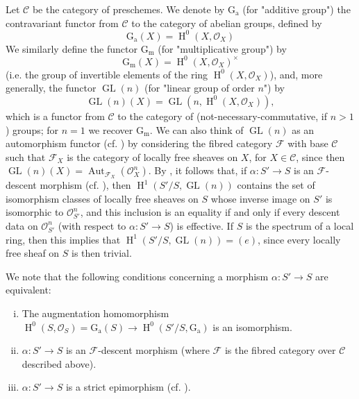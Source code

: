 \label{fga3.i-a.4.e}
\begin{example}\label{fga3.i-a.4-example-2}
    Let $\mathcal{C}$ be the category of preschemes.
    We denote by $\operatorname{G_a}$ (for "additive group") the contravariant functor from $\mathcal{C}$ to the category of abelian groups, defined by
    \[
        \operatorname{G_a}(X) = \operatorname{H}^0(X,\mathcal{O}_X)
    \]
    We similarly define the functor $\operatorname{G_m}$ (for "multiplicative group") by
    \[
        \operatorname{G_m}(X) = \operatorname{H}^0(X,\mathcal{O}_X)^\times
    \]
    (i.e. the group of invertible elements of the ring $\operatorname{H}^0(X,\mathcal{O}_X)$), and, more generally, the functor $\operatorname{GL}(n)$ (for "linear group of order $n$") by
    \[
        \operatorname{GL}(n)(X) = \operatorname{GL}(n,\operatorname{H}^0(X,\mathcal{O}_X)),
    \]
    which is a functor from $\mathcal{C}$ to the category of (not-necessary-commutative, if $n>1$) groups;
    for $n=1$ we recover $\operatorname{G_m}$.
    We can also think of $\operatorname{GL}(n)$ as an automorphism functor (cf. ) by considering the fibred category $\mathcal{F}$ with base $\mathcal{C}$ such that $\mathcal{F}_X$ is the category of locally free sheaves on $X$, for $X\in\mathcal{C}$, since then $\operatorname{GL}(n)(X)=\operatorname{Aut}_{\mathcal{F}_X}(\mathcal{O}_X^n)$.
    By , it follows that, if $\alpha\colon S'\to S$ is an $\mathcal{F}$-descent morphism (cf. ), then $\operatorname{H}^1(S'/S,\operatorname{GL}(n))$ contains the set of isomorphism classes of locally free sheaves on $S$ whose inverse image on $S'$ is isomorphic to $\mathcal{O}_{S'}^n$, and this inclusion is an equality if and only if every descent data on $\mathcal{O}_{S'}^n$ (with respect to $\alpha\colon S'\to S$) is effective.
    If $S$ is the spectrum of a local ring, then this implies that $\operatorname{H}^1(S'/S,\operatorname{GL}(n))=(e)$, since every locally free sheaf on $S$ is then trivial.
\end{example}

We note that the following conditions concerning a morphism $\alpha\colon S'\to S$ are equivalent:
\begin{enumerate}[i.]
    \item The augmentation homomorphism $\operatorname{H}^0(S,\mathcal{O}_S) = \operatorname{G_a}(S)\to\operatorname{H}^0(S'/S,\operatorname{G_a})$ is an isomorphism.
    \item $\alpha\colon S'\to S$ is an $\mathcal{F}$-descent morphism (where $\mathcal{F}$ is the fibred category over $\mathcal{C}$ described above).
    \item $\alpha\colon S'\to S$ is a strict epimorphism (cf. ).
\end{enumerate}

